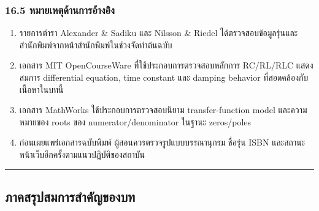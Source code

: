 \subsubsection{16.5 หมายเหตุด้านการอ้างอิง}

\begin{enumerate}
    \item รายการตำรา Alexander \& Sadiku และ Nilsson \& Riedel ได้ตรวจสอบข้อมูลรุ่นและสำนักพิมพ์จากหน้าสำนักพิมพ์ในช่วงจัดทำต้นฉบับ
    \item เอกสาร MIT OpenCourseWare ที่ใช้ประกอบการตรวจสอบหลักการ RC/RL/RLC แสดงสมการ differential equation, time constant และ damping behavior ที่สอดคล้องกับเนื้อหาในบทนี้
    \item เอกสาร MathWorks ใช้ประกอบการตรวจสอบนิยาม transfer-function model และความหมายของ roots ของ numerator/denominator ในฐานะ zeros/poles
    \item ก่อนเผยแพร่เอกสารฉบับพิมพ์ ผู้สอนควรตรวจรูปแบบบรรณานุกรม ชื่อรุ่น ISBN และสถานะหน้าเว็บอีกครั้งตามแนวปฏิบัติของสถาบัน
\end{enumerate}

\par\noindent\rule{\textwidth}{0.4pt}\par

\subsection{ภาคสรุปสมการสำคัญของบท}

